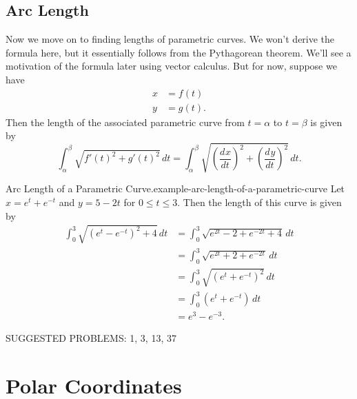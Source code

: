 \documentclass[10pt,]{book}
\numberwithin{equation}{section}
\newcommand{\dv}[3][]{\dfrac{d^{#1} #2}{d #3^{#1}}}
\newcommand{\amp}{&}
\begin{document}
\subsection[{Arc Length}]{Arc Length}\label{subsection-arc-length}
\hypertarget{p-1010}{}%
Now we move on to finding lengths of parametric curves. We won't derive the formula here, but it essentially follows from the Pythagorean theorem. We'll see a motivation of the formula later using vector calculus. But for now, suppose we have%
%
\begin{align*}
x \amp = f(t) \\
y \amp = g(t). 
\end{align*}
\hypertarget{p-1011}{}%
Then the length of the associated parametric curve from \(t=\alpha\) to \(t=\beta\) is given by%
%
\begin{equation*}
\int_{\alpha}^{\beta} \sqrt{f'(t)^{2}+g'(t)^{2}}\,dt = \int_{\alpha}^{\beta}\sqrt{\left(\dv{x}{t}\right)^{2} + \left(\dv{y}{t}\right)^{2}}\,dt.
\end{equation*}
\begin{example}{Arc Length of a Parametric Curve.}{example-arc-length-of-a-parametric-curve}%
\hypertarget{p-1012}{}%
Let \(x = e^{t}+e^{-t}\) and \(y = 5-2t\) for \(0\leq t\leq 3.\) Then the length of this curve is given by%
%
\begin{align*}
\int_{0}^{3}\sqrt{(e^{t}-e^{-t})^{2} + 4}\,dt \amp = \int_{0}^{3}\sqrt{e^{2t}-2 + e^{-2t} + 4}\,dt \\
\amp = \int_{0}^{3}\sqrt{e^{2t} + 2 + e^{-2t}}\,dt \\
\amp = \int_{0}^{3}\sqrt{(e^{t}+e^{-t})^{2}}\,dt \\
\amp = \int_{0}^{3}(e^{t}+e^{-t})\,dt\\
\amp = e^{3}-e^{-3}.
\end{align*}
\end{example}
\hypertarget{p-1013}{}%
SUGGESTED PROBLEMS: 1, 3, 13, 37%
%
%
\typeout{************************************************}
\typeout{************************************************}
%
\section[{Polar Coordinates}]{Polar Coordinates}\label{section-polar-coordinates}
%
%
\typeout{************************************************}
\typeout{************************************************}
%
\end{document}
